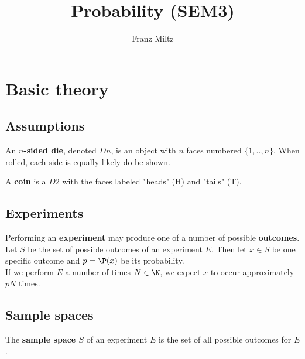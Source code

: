 \documentclass{article}
\begin{document}
\title{Probability (SEM3)}
\author{Franz Miltz}
\maketitle
\tableofcontents
\pagebreak

\section{Basic theory}
\subsection{Assumptions}
\begin{definition}
    An \textbf{$n$-sided die}, denoted $Dn$, is an object with $n$ faces numbered $\{1,..,n\}$.
    When rolled, each side is equally likely do be shown.
\end{definition}
\begin{definition}
    A \textbf{coin} is a $D2$ with the faces labeled "heads" (H) and "tails" (T).
\end{definition}
\subsection{Experiments}
\begin{definition}
    Performing an \textbf{experiment} may produce one of a number of possible \textbf{outcomes}.
    Let $S$ be the set of possible outcomes of an experiment $E$. Then let $x\in S$ be one specific outcome and
    $p=\P(x)$ be its probability.\\
    If we perform $E$ a number of times $N\in\N$, we expect $x$ to occur approximately $pN$ times.
\end{definition}
\subsection{Sample spaces}
\begin{definition}
    The \textbf{sample space $S$} of an experiment $E$ is the set of all possible outcomes for $E$.
\end{definition}
\end{document}
